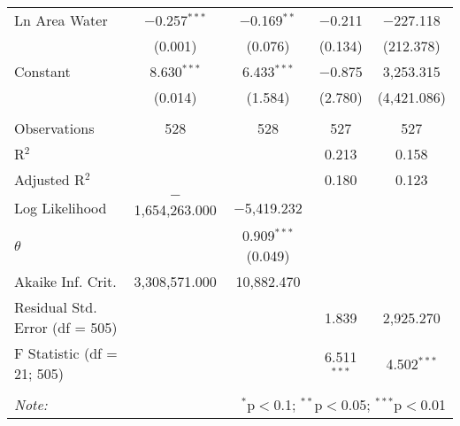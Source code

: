 \begin{table}[!htbp]
\begin{tabular}{@{\extracolsep{5pt}}lcccc}
  Ln Area Water & $-$0.257$^{***}$ & $-$0.169$^{**}$ & $-$0.211 & $-$227.118 \\ 
  & (0.001) & (0.076) & (0.134) & (212.378) \\ 
  Constant & 8.630$^{***}$ & 6.433$^{***}$ & $-$0.875 & 3,253.315 \\ 
  & (0.014) & (1.584) & (2.780) & (4,421.086) \\ 
 \hline \\[-1.8ex] 
Observations & 528 & 528 & 527 & 527 \\ 
R$^{2}$ &  &  & 0.213 & 0.158 \\ 
Adjusted R$^{2}$ &  &  & 0.180 & 0.123 \\ 
Log Likelihood & $-$1,654,263.000 & $-$5,419.232 &  &  \\ 
$\theta$ &  & 0.909$^{***}$  (0.049) &  &  \\ 
Akaike Inf. Crit. & 3,308,571.000 & 10,882.470 &  &  \\ 
Residual Std. Error (df = 505) &  &  & 1.839 & 2,925.270 \\ 
F Statistic (df = 21; 505) &  &  & 6.511$^{***}$ & 4.502$^{***}$ \\ 
\hline 
\hline \\[-1.8ex] 
\textit{Note:}  & \multicolumn{4}{r}{$^{*}$p$<$0.1; $^{**}$p$<$0.05; $^{***}$p$<$0.01} \\ 
\end{tabular} 
\end{table} 
